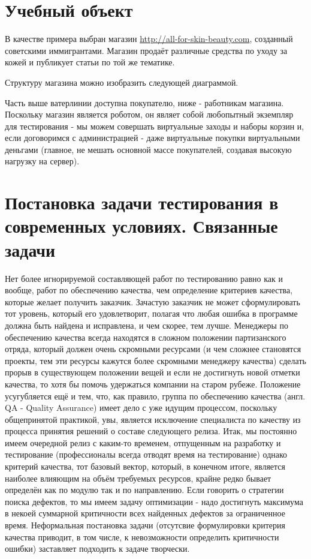 \documentclass[a4paper]{book}
\begin{document}
\section{Учебный объект}

В качестве примера выбран магазин
\url{http://all-for-skin-beauty.com}, созданный советскими
иммигрантами. Магазин продаёт различные средства по уходу за
кожей и публикует статьи по той же тематике.

Структуру магазина можно изобразить следующей диаграммой.

Часть выше ватерлинии доступна покупателю, ниже - работникам
магазина. Поскольку магазин является роботом, он являет собой
любопытный экземпляр для тестирования - мы можем совершать
виртуальные заходы и наборы корзин и, если договоримся с
администрацией - даже виртуальные покупки виртуальными деньгами
(главное, не мешать основной массе покупателей, создавая высокую
нагрузку на сервер).


\section{Постановка задачи тестирования в современных условиях. 
         Связанные задачи}

Нет более игнорируемой составляющей работ по тестированию равно
как и вообще, работ по обеспечению качества, чем определение
критериев качества, которые желает получить заказчик. Зачастую
заказчик не может сформулировать тот уровень, который его
удовлетворит, полагая что любая ошибка в программе должна быть
найдена и исправлена, и чем скорее, тем лучше. Менеджеры по
обеспечению качества всегда находятся в сложном положении
партизанского отряда, который должен очень скромными ресурсами (и
чем сложнее становятся проекты, тем эти ресурсы кажутся более
скромными менеджеру качества) сделать прорыв в существующем
положении вещей и если не достигнуть новой отметки качества, то
хотя бы помочь удержаться компании на старом рубеже. Положение
усугубляется ещё и тем, что, как правило, группа по обеспечению
качества (англ. QA - Quality Assurance) имеет дело с уже идущим
процессом, поскольку общепринятой практикой, увы, является
исключение специалиста по качеству из процесса принятия решений о
составе следующего релиза. Итак, мы постоянно имеем очередной
релиз с каким-то временем, отпущенным на разработку и
тестирование (профессионалы всегда отводят время на тестирование)
однако критерий качества, тот базовый вектор, который, в конечном
итоге, является наиболее влияющим на объём требуемых ресурсов,
крайне редко бывает определён как по модулю так и по
направлению. Если говорить о стратегии поиска дефектов, то мы
имеем задачу оптимизации - надо достигнуть максимума в некоей
суммарной критичности всех найденных дефектов за ограниченное
время. Неформальная постановка задачи (отсутсвие формулировки
критерия качества приводит, в том числе, к невозможности
определить критичности ошибки) заставляет подходить к задаче
творчески.
\end{document}

